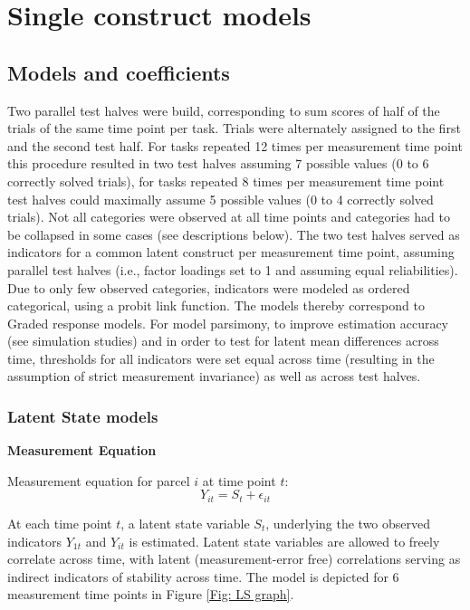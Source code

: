 \section{Single construct models}

\subsection{Models and coefficients}

Two parallel test halves were build, corresponding to sum scores of half of the trials of the same time point per task. Trials were alternately assigned to the first and the second test half. For tasks repeated 12 times per measurement time point this procedure resulted in two test halves assuming 7 possible values (0 to 6 correctly solved trials), for tasks repeated 8 times per measurement time point test halves could maximally assume 5 possible values (0 to 4 correctly solved trials). Not all categories were observed at all time points and categories had to be collapsed in some cases (see descriptions below). The two test halves served as indicators for a common latent construct per measurement time point, assuming parallel test halves (i.e., factor loadings set to 1 and assuming equal reliabilities). Due to only few observed categories, indicators were modeled as ordered categorical, using a probit link function. The models thereby correspond to Graded response models. For model parsimony, to improve estimation accuracy (see simulation studies) and in order to test for latent mean differences across time, thresholds for all indicators were set equal across time (resulting in the assumption of strict measurement invariance) as well as across test halves.

\subsubsection{Latent State models}

\textbf{Measurement Equation}

Measurement equation for parcel $i$ at time point $t$:
\begin{equation}
Y_{it}= S_t + \epsilon_{it}
\end{equation}

At each time point $t$, a latent state variable $S_t$, underlying the two observed indicators $Y_{1t}$ and $Y_{it}$ is estimated. Latent state variables are allowed to freely correlate across time, with latent (measurement-error free) correlations serving as indirect indicators of stability across time. The model is depicted for 6 measurement time points in Figure \ref{Fig: LS graph}. 

